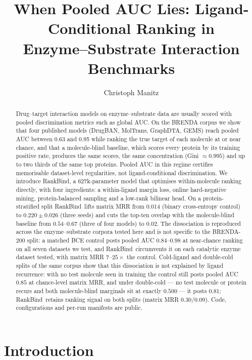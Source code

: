 \documentclass[11pt,a4paper]{article}
\title{\textbf{When Pooled AUC Lies: Ligand-Conditional Ranking in\\
Enzyme--Substrate Interaction Benchmarks}}
\author[1]{Christoph Manitz}
\affil[1]{Leipzig University, Germany \\
\texttt{christoph.manitz@uni-leipzig.de}}
\date{}
\newcommand{\method}{RankBind\xspace}
\newcommand{\mrr}{matrix MRR}
\begin{document}
\maketitle

\begin{abstract}
Drug--target interaction models on enzyme--substrate data are usually scored
with pooled discrimination metrics such as global AUC. On the BRENDA corpus
we show that four published models (DrugBAN, MolTrans, GraphDTA, GEMS) reach
pooled AUC between 0.63 and 0.95 while ranking the true target of each
molecule at or near chance, and that a molecule-blind baseline, which scores
every protein by its training positive rate, produces the same scores, the
same concentration (Gini $\approx 0.995$) and up to two thirds of the same
top proteins. Pooled AUC in this regime certifies memorisable
dataset-level regularities, not ligand-conditional discrimination. We introduce \method, a 627k-parameter model that optimises
within-molecule ranking directly, with four ingredients: a within-ligand
margin loss, online hard-negative mining, protein-balanced sampling and a
low-rank bilinear head. On a protein-stratified split \method\ lifts \mrr{}
from 0.014 (binary cross-entropy control) to $0.220 \pm 0.026$ (three seeds)
and cuts the top-ten overlap with the molecule-blind baseline from
$0.54$--$0.67$ (three of four models) to $0.02$. The dissociation is
reproduced across the enzyme--substrate corpora tested here and is not
specific to the BRENDA-200 split: a matched BCE control posts pooled AUC
$0.84$--$0.98$ at near-chance ranking on all seven datasets we test, and
\method\ circumvents it on each catalytic enzyme dataset tested, with \mrr{}
$7$--$25\times$ the control.
Cold-ligand and double-cold splits of the same corpus show that this
dissociation is not explained by ligand recurrence: with no test molecule
seen in training the control still posts pooled AUC $0.85$ at chance-level
\mrr{}, and under double-cold --- no test molecule or protein recurs and
both molecule-blind marginals sit at exactly $0.500$ --- it posts $0.81$;
\method\ retains ranking signal on both splits (\mrr{} $0.30$/$0.09$).
Code, configurations and per-run manifests are public.
\end{abstract}

\section{Introduction}
\label{sec:intro}
\end{document}
